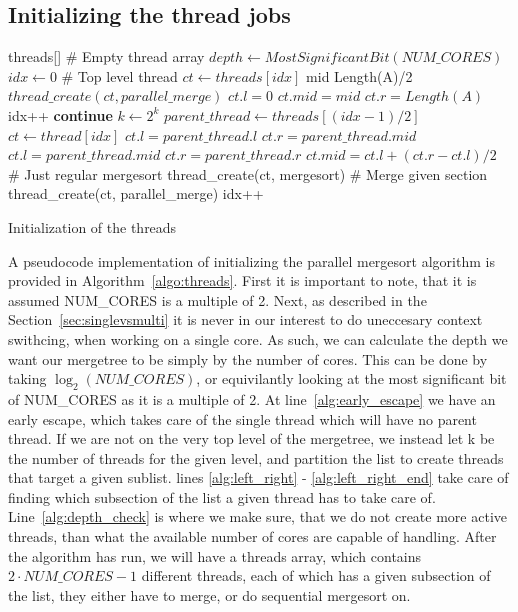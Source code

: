 \subsection{Initializing the thread jobs}\label{sec:init_threads}
\begin{algorithm}
  \begin{algorithmic}[1]
    \Require threads[] \# Empty thread array
    \State $depth \leftarrow MostSignificantBit(NUM\_CORES)$
    \State $idx \leftarrow 0$
     \label{alg:early_escape}
    \State \# Top level thread
    \State $ct \leftarrow threads[idx]$
    \State mid \leftarrow Length(A)/2
    \State $thread\_create(ct, parallel\_merge)$
    \State $ct.l = 0$
    \State $ct.mid = mid$
    \State $ct.r = Length(A)$
    \State idx++
    \State \textbf{continue}
    \EndIf
    \State $k \leftarrow 2^k$
    \State $parent\_thread \leftarrow threads[(idx - 1)/2]$
    \State $ct \leftarrow thread[idx]$
     \label{alg:left_right}
    \State $ct.l = parent\_thread.l$
    \State $ct.r = parent\_thread.mid$
    \Else
    \State $ct.l = parent\_thread.mid$
    \State $ct.r = parent\_thread.r$
    \EndIf
    \State $ct.mid = ct.l + (ct.r - ct.l)/2$ \label{alg:left_right_end}
     \label{alg:depth_check}
    \State \# Just regular mergesort
    \State thread\_create(ct, mergesort)
    \Else
    \State \# Merge given section
    \State thread\_create(ct, parallel\_merge)
    \EndIf
    \State idx++
    \EndFor
    \EndFor
  \EndProcedure
  \end{algorithmic}
  \caption{Initialization of the threads}\label{algo:threads}
\end{algorithm}
A pseudocode implementation of initializing the parallel mergesort algorithm is
provided in Algorithm~\ref{algo:threads}. First it is important to note, that it
is assumed NUM\_CORES is a multiple of 2. Next, as described in the
Section~\ref{sec:singlevsmulti} it is never in our interest to do uneccesary
context swithcing, when working on a single core. As such, we can calculate the
depth we want our mergetree to be simply by the number of cores. This can be
done by taking $\log_2(NUM\_CORES)$, or equivilantly looking at the most
significant bit of NUM\_CORES as it is a multiple of 2. At line~\ref{alg:early_escape}
we have an early escape, which takes care of the single thread which will have
no parent thread. If we are not on the very top level of the mergetree, we
instead let k be the number of threads for the given level, and partition the
list to create threads that target a given sublist. lines \ref{alg:left_right} -
\ref{alg:left_right_end} take care of finding which subsection of the list a
given thread has to take care of. Line~\ref{alg:depth_check} is where we make
sure, that we do not create more active threads, than what the available number
of cores are capable of handling. After the algorithm has run, we will have
a threads array, which contains $2 \cdot NUM\_CORES - 1$ different threads, each
of which has a given subsection of the list, they either have to merge, or do
sequential mergesort on.

